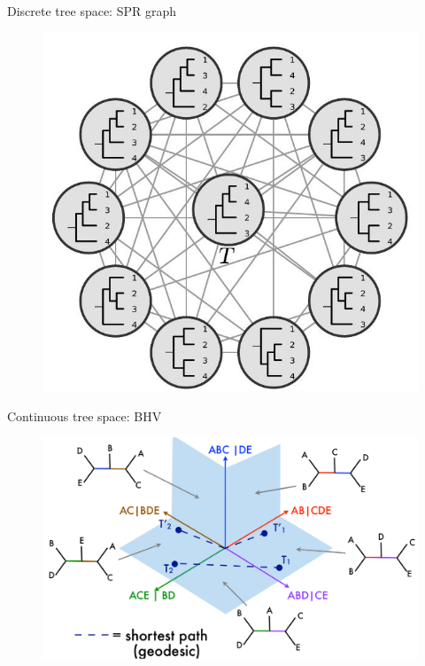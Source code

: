 \documentclass[newPxFont,numfooter,sectionpages]{beamer}
\begin{document}
\begin{frame}{Discrete tree space: SPR graph}
\begin{center}
 \begin{figure}
	\includegraphics[scale=0.5]{figures/spr_graph.jpg}
\end{figure}
\end{center}
\end{frame}

\begin{frame}{Continuous tree space: BHV}
\begin{center}
 \begin{figure}
	\includegraphics[scale=0.325]{figures/MeganOwen_BHV.pdf}
\end{figure}
\end{center}
\end{frame}
\end{document}
